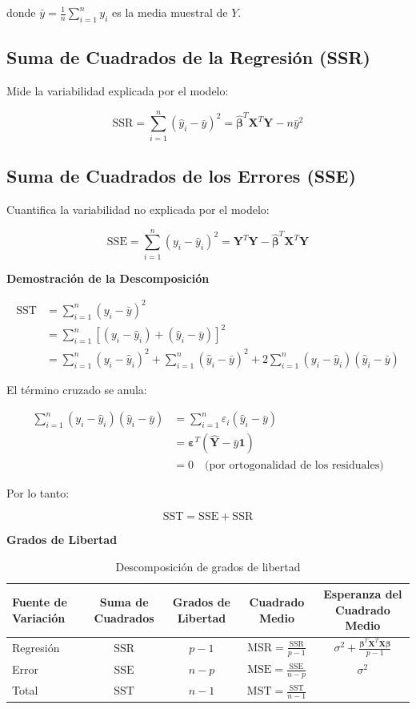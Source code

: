 \documentclass[12pt]{article}
\begin{document}
donde $\bar{y} = \frac{1}{n}\sum_{i=1}^{n}y_i$ es la media muestral de $Y$.

\subsection{Suma de Cuadrados de la Regresión (SSR)}

Mide la variabilidad explicada por el modelo:

\[
\text{SSR} = \sum_{i=1}^{n}(\hat{y}_i - \bar{y})^2 = \hat{\boldsymbol{\beta}}^T\mathbf{X}^T\mathbf{Y} - n\bar{y}^2
\]

\subsection{Suma de Cuadrados de los Errores (SSE)}

Cuantifica la variabilidad no explicada por el modelo:

\[
\text{SSE} = \sum_{i=1}^{n}(y_i - \hat{y}_i)^2 = \mathbf{Y}^T\mathbf{Y} - \hat{\boldsymbol{\beta}}^T\mathbf{X}^T\mathbf{Y}
\]

\textbf{Demostración de la Descomposición}

\begin{align*}
\text{SST} &= \sum_{i=1}^{n}(y_i - \bar{y})^2 \\
&= \sum_{i=1}^{n}[(y_i - \hat{y}_i) + (\hat{y}_i - \bar{y})]^2 \\
&= \sum_{i=1}^{n}(y_i - \hat{y}_i)^2 + \sum_{i=1}^{n}(\hat{y}_i - \bar{y})^2 + 2\sum_{i=1}^{n}(y_i - \hat{y}_i)(\hat{y}_i - \bar{y})
\end{align*}

El término cruzado se anula:

\begin{align*}
\sum_{i=1}^{n}(y_i - \hat{y}_i)(\hat{y}_i - \bar{y}) &= \sum_{i=1}^{n}\varepsilon_i(\hat{y}_i - \bar{y}) \\
&= \boldsymbol{\varepsilon}^T(\mathbf{\hat{Y}} - \bar{y}\mathbf{1}) \\
&= 0 \quad \text{(por ortogonalidad de los residuales)}
\end{align*}

Por lo tanto:

\[
\text{SST} = \text{SSE} + \text{SSR}
\]

\textbf{Grados de Libertad}

\begin{table}[h]
\centering
\caption{Descomposición de grados de libertad}
\begin{tabular}{lcccc}
\toprule
Fuente de Variación & Suma de Cuadrados & Grados de Libertad & Cuadrado Medio & Esperanza del Cuadrado Medio \\
\midrule
Regresión & $\text{SSR}$ & $p-1$ & $\text{MSR} = \frac{\text{SSR}}{p-1}$ & $\sigma^2 + \frac{\boldsymbol{\beta}^T\mathbf{X}^T\mathbf{X}\boldsymbol{\beta}}{p-1}$ \\
Error & $\text{SSE}$ & $n-p$ & $\text{MSE} = \frac{\text{SSE}}{n-p}$ & $\sigma^2$ \\
Total & $\text{SST}$ & $n-1$ & $\text{MST} = \frac{\text{SST}}{n-1}$ & \\
\bottomrule
\end{tabular}
\end{table}
\end{document}
